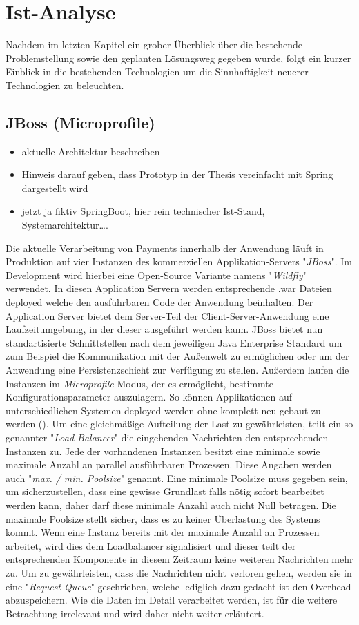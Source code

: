 \chapter{Ist-Analyse}

Nachdem im letzten Kapitel ein grober Überblick über die bestehende Problemstellung sowie den geplanten Lösungsweg gegeben wurde, folgt ein kurzer Einblick in die bestehenden Technologien um die Sinnhaftigkeit neuerer Technologien zu beleuchten. 

\section{JBoss (Microprofile)}
\begin{itemize}
  \item aktuelle Architektur beschreiben
  \item Hinweis darauf geben, dass Prototyp in der Thesis vereinfacht mit Spring dargestellt wird
  \item jetzt ja fiktiv SpringBoot, hier rein technischer Ist-Stand, Systemarchitektur….
\end{itemize}

Die aktuelle Verarbeitung von Payments innerhalb der Anwendung läuft in Produktion auf vier Instanzen des kommerziellen Applikation-Servers "\emph{JBoss}". Im Development wird hierbei eine Open-Source Variante namens "\emph{Wildfly}" verwendet. In diesen Application Servern werden entsprechende .war Dateien deployed welche den ausführbaren Code der Anwendung beinhalten. Der Application Server bietet dem Server-Teil der Client-Server-Anwendung eine Laufzeitumgebung, in der dieser ausgeführt werden kann. JBoss bietet nun standartisierte Schnittstellen nach dem jeweiligen Java Enterprise Standard um zum Beispiel die Kommunikation mit der Außenwelt zu ermöglichen oder um der Anwendung eine Persistenzschicht zur Verfügung zu stellen. Außerdem laufen die Instanzen im \emph{Microprofile} Modus, der es ermöglicht, bestimmte Konfigurationsparameter auszulagern. So können Applikationen auf unterschiedlichen Systemen deployed werden ohne komplett neu gebaut zu werden (\cite{microprofile}). Um eine gleichmäßige Aufteilung der Last zu gewährleisten, teilt ein so genannter "\emph{Load Balancer}" die eingehenden Nachrichten den entsprechenden Instanzen zu. Jede der vorhandenen Instanzen besitzt eine minimale sowie maximale Anzahl an parallel ausführbaren Prozessen. Diese Angaben werden auch "\emph{max. / min. Poolsize}" genannt. Eine minimale Poolsize muss gegeben sein, um sicherzustellen, dass eine gewisse Grundlast falls nötig sofort bearbeitet werden kann, daher darf diese minimale Anzahl auch nicht Null betragen. Die maximale Poolsize stellt sicher, dass es zu keiner Überlastung des Systems kommt. Wenn eine Instanz bereits mit der maximale Anzahl an Prozessen arbeitet, wird dies dem Loadbalancer signalisiert und dieser teilt der entsprechenden Komponente in diesem Zeitraum keine weiteren Nachrichten mehr zu. Um zu gewährleisten, dass die Nachrichten nicht verloren gehen, werden sie in eine "\emph{Request Queue}" geschrieben, welche lediglich dazu gedacht ist den Overhead abzuspeichern. Wie die Daten im Detail verarbeitet werden, ist für die weitere Betrachtung irrelevant und wird daher nicht weiter erläutert.

